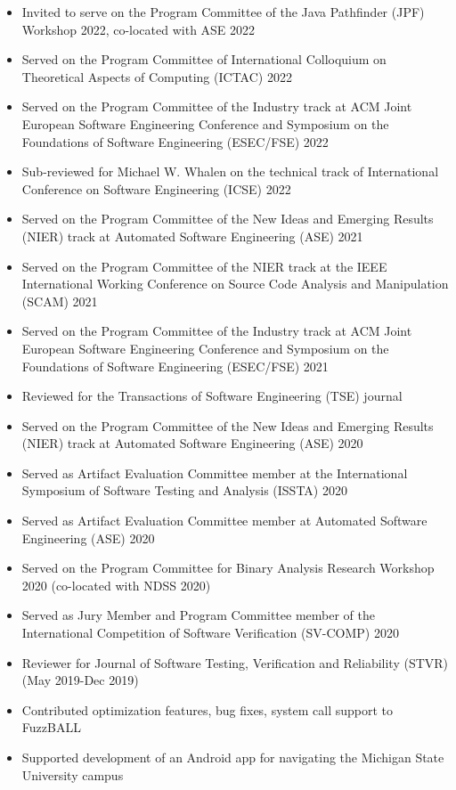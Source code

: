 \documentclass[letterpaper,10pt]{article}
\newlength{\outerbordwidth}
\newcommand{\resheading}[1]{\vspace{-8pt}
  \parbox{\textwidth}{\setlength{\FrameSep}{\outerbordwidth}
    \begin{shaded}
\setlength{\fboxsep}{0pt}\framebox[\textwidth][l]{\setlength{\fboxsep}{4pt}\fcolorbox{shadecolorB}{shadecolorB}{\textbf{\sffamily{\mbox{~}\makebox[6.762in][l]{\large #1} \vphantom{p\^{E}}}}}}
    \end{shaded}
  }\vspace{-5pt}
}
\begin{document}
\resheading{Service}
\vspace{-8pt}
\begin{itemize}
  \item Invited to serve on the Program Committee of the Java Pathfinder (JPF) Workshop 2022, co-located with ASE 2022
  \item Served on the Program Committee of International Colloquium on Theoretical Aspects of Computing (ICTAC) 2022
  \item Served on the Program Committee of the Industry track at ACM Joint European Software Engineering Conference and Symposium on the Foundations of Software Engineering (ESEC/FSE) 2022
  \item Sub-reviewed for Michael W. Whalen on the technical track of International Conference on Software Engineering (ICSE) 2022
  \item Served on the Program Committee of the New Ideas and Emerging Results (NIER) track at Automated Software Engineering (ASE) 2021
  \item Served on the Program Committee of the NIER track at the IEEE International Working Conference on Source Code Analysis and Manipulation (SCAM) 2021
  \item Served on the Program Committee of the Industry track at ACM Joint European Software Engineering Conference and Symposium on the Foundations of Software Engineering (ESEC/FSE) 2021
  \item Reviewed for the Transactions of Software Engineering (TSE) journal
  \item Served on the Program Committee of the New Ideas and Emerging Results (NIER) track at Automated Software Engineering (ASE) 2020
  \item Served as Artifact Evaluation Committee member at the International Symposium of Software Testing and Analysis (ISSTA) 2020
  \item Served as Artifact Evaluation Committee member at Automated Software Engineering (ASE) 2020
  \item Served on the Program Committee for Binary Analysis Research Workshop 2020 (co-located with NDSS 2020)
  \item Served as Jury Member and Program Committee member of the International Competition of Software Verification (SV-COMP) 2020
  \item Reviewer for Journal of Software Testing, Verification and Reliability (STVR) (May 2019-Dec 2019)
  \item Contributed optimization features, bug fixes, system call support to FuzzBALL
  \item Supported development of an Android app for navigating the Michigan State University campus
\end{itemize}
\end{document}
